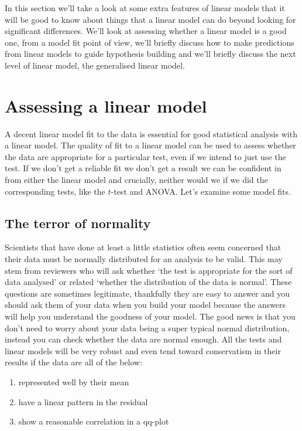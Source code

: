 \documentclass[
]{book}
\providecommand{\tightlist}{%
  \setlength{\itemsep}{0pt}\setlength{\parskip}{0pt}}
\begin{document}
In this section we'll take a look at some extra features of linear models that it will be good to know about things that a linear model can do beyond looking for significant differences. We'll look at assessing whether a linear model is a good one, from a model fit point of view, we'll briefly discuss how to make predictions from linear models to guide hypothesis building and we'll briefly discuss the next level of linear model, the generalised linear model.

\hypertarget{assessing-a-linear-model}{%
\section{Assessing a linear model}\label{assessing-a-linear-model}}

A decent linear model fit to the data is essential for good statistical analysis with a linear model. The quality of fit to a linear model can be used to assess whether the data are appropriate for a particular test, even if we intend to just use the test. If we don't get a reliable fit we don't get a result we can be confident in from either the linear model and crucially, neither would we if we did the corresponding tests, like the \(t\)-test and ANOVA. Let's examine some model fits.

\hypertarget{the-terror-of-normality}{%
\subsection{The terror of normality}\label{the-terror-of-normality}}

Scientists that have done at least a little statistics often seem concerned that their data must be normally distributed for an analysis to be valid. This may stem from reviewers who will ask whether `the test is appropriate for the sort of data analysed' or related `whether the distribution of the data is normal'. These questions are sometimes legitimate, thankfully they are easy to answer and you should ask them of your data when you build your model because the answers will help you understand the goodness of your model. The good news is that you don't need to worry about your data being a super typical normal distribution, instead you can check whether the data are normal enough. All the tests and linear models will be very robust and even tend toward conservatism in their results if the data are all of the below:

\begin{enumerate}
\def\labelenumi{\arabic{enumi}.}
\tightlist
\item
  represented well by their mean
\item
  have a linear pattern in the residual
\item
  show a reasonable correlation in a qq-plot
\end{enumerate}
\end{document}
